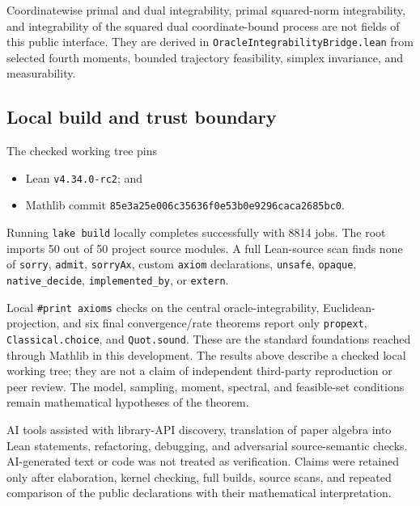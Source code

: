 Coordinatewise primal and dual integrability, primal squared-norm
integrability, and integrability of the squared dual coordinate-bound process
are not fields of this public interface.  They are derived in
\texttt{OracleIntegrabilityBridge.lean} from selected fourth moments, bounded
trajectory feasibility, simplex invariance, and measurability.

\subsection{Local build and trust boundary}

The checked working tree pins
\begin{itemize}[leftmargin=*]
  \item Lean \texttt{v4.34.0-rc2}; and
  \item Mathlib commit
        \texttt{85e3a25e006c35636f0e53b0e9296caca2685bc0}.
\end{itemize}
Running \texttt{lake build} locally completes successfully with 8814 jobs.
The root imports 50 out of 50 project source modules.  A full Lean-source scan
finds none of \texttt{sorry}, \texttt{admit}, \texttt{sorryAx}, custom
\texttt{axiom} declarations, \texttt{unsafe}, \texttt{opaque},
\texttt{native\_decide}, \texttt{implemented\_by}, or \texttt{extern}.

Local \texttt{\#print axioms} checks on the central oracle-integrability,
Euclidean-projection, and six final convergence/rate theorems report only
\texttt{propext}, \texttt{Classical.choice}, and \texttt{Quot.sound}.  These
are the standard foundations reached through Mathlib in this development.
The results above describe a checked local working tree; they are not a claim
of independent third-party reproduction or peer review.  The model, sampling,
moment, spectral, and feasible-set conditions remain mathematical hypotheses
of the theorem.

AI tools assisted with library-API discovery, translation of paper algebra
into Lean statements, refactoring, debugging, and adversarial source-semantic
checks.  AI-generated text or code was not treated as verification.  Claims
were retained only after elaboration, kernel checking, full builds, source
scans, and repeated comparison of the public declarations with their
mathematical interpretation.
